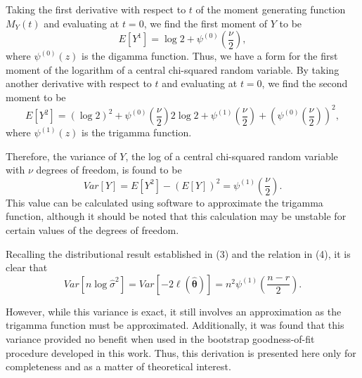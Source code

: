 \documentclass[sn-mathphys-ay]{sn-jnl}
\begin{document}
Taking the first derivative with respect to $t$ of the moment generating function $M_Y (t)$ and evaluating at $t=0$, we find the first moment of $Y$ to be
\begin{equation*}
	E \left[ Y^1 \right] =  \log 2 + \psi^{(0)} \left( \frac{\nu}{2} \right) ,
\end{equation*}
where $\psi^{(0)}(z)$ is the digamma function. Thus, we have a form for the first moment of the logarithm of a central chi-squared random variable. By taking another
derivative with respect to $t$ and evaluating at $t=0$, we find the second moment to be
\begin{equation*}
	E \left[ Y^2 \right] =
	(\log 2)^2 + \psi^{(0)} \left( \frac{\nu}{2} \right) 2 \log 2  + \psi^{(1)} \left( \frac{\nu}{2} \right) + \left( \psi^{(0)} \left( \frac{\nu}{2} \right) \right)^2 ,
\end{equation*}
where $\psi^{(1)}(z)$ is the trigamma function.

Therefore, the variance of $Y$, the log of a central chi-squared random variable with
$\nu$ degrees of freedom, is found to be
\begin{equation*}
	Var \left[ Y \right] = E \left[ Y^2 \right] - \left( E \left[ Y \right] \right)^2 = \psi^{(1)} \left( \frac{\nu}{2} \right) .
\end{equation*}
This value can be calculated using software to approximate the trigamma function, although it should be noted that this calculation may be unstable for certain values of the degrees of freedom.

Recalling the distributional result established in (3) and the relation in (4), it is clear that
\begin{equation*}
	Var \left[ n \log \hat{\sigma}^2 \right] = Var \left[ -2 \ell (\hat{\bm{\theta}} ) \right] = n^2 \psi^{(1)} \left( \frac{n-r}{2} \right).
\end{equation*}

However, while this variance is exact, it still involves an approximation as the trigamma function must be approximated. Additionally, it was found that
this variance provided no benefit when used in the bootstrap goodness-of-fit procedure developed in this work. Thus, this derivation is presented here only
for completeness and as a matter of theoretical interest.



%

\end{document}
